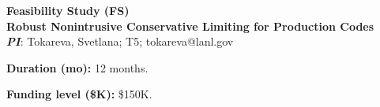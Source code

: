 \documentclass[12pt,twoside]{paper}
\begin{document}
\hypersetup{citecolor=blue,
            linkcolor=blue,
            urlcolor=blue,
            pdftitle=ti}



\newcommand{\ie}{i.e.,\@\xspace}
\newcommand{\eg}{e.g.,\@\xspace}
\newcommand{\eqq}{{:=}}
\def\Real{{\mathbb R}}
\newcommand{\bu}{\textbf{u}}
\newcommand{\bv}{\textbf{v}}
\newcommand\bsfu{\textsf{\textbf u}}
\newcommand\bsfv{\textsf{\textbf v}}

\newcommand{\calA}{{\mathcal A}}
\newcommand{\calI}{{\mathcal I}}
\newcommand{\calL}{{\mathcal L}}
\newcommand{\calT}{{\mathcal T}}
\newcommand{\calV}{{\mathcal V}}

\newcommand{\new}[1]{\textcolor{magenta}{#1}}
\newcommand{\ST}[1]{\textcolor{blue}{#1}}
\newcommand{\jlg}[1]{\textcolor{Maroon}{#1}}





\begin{center}
    \large \textbf{Feasibility Study (FS)}\\
    \vspace{0.5cm}
    \normalsize \textbf{Robust Nonintrusive Conservative Limiting for
      Production Codes}\\
    \textbf{\textit{PI}}: Tokareva, Svetlana; T5; tokareva@lanl.gov
\end{center}
\vspace*{\baselineskip}

\textbf{Duration (mo):} 12 months.
\vspace*{\baselineskip}

\textbf{Funding level (\$K):} \$150K.
\vspace*{\baselineskip}
\end{document}
